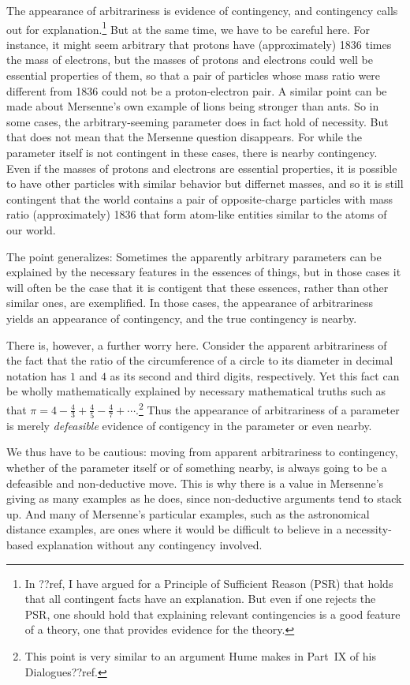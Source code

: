 The appearance of arbitrariness is evidence of contingency, and contingency calls out for explanation.\footnote{In ??ref, I have
argued for a Principle of Sufficient Reason (PSR) that holds that all contingent facts have an explanation. But even if one rejects
the PSR, one should hold that explaining relevant contingencies is a good feature of a theory, one that provides evidence for the
theory.} But at the 
same time, we have to be careful here. For instance,
it might seem arbitrary that protons have (approximately) 1836 times the mass of electrons, but the masses of protons and
electrons could well be essential properties of them, so that a pair of particles whose mass ratio were different from 1836 could 
not be a proton-electron pair. A similar point can be made about Mersenne's own example of lions being stronger
than ants.  So in some cases, the arbitrary-seeming parameter does in fact hold of necessity. But that does not
mean that the Mersenne question disappears. For while the parameter itself is not contingent in these cases, there is 
nearby contingency. Even if the masses of protons and electrons are essential properties, it is possible to have 
other particles with similar
behavior but differnet masses, and so it is still contingent that the world contains a pair of opposite-charge particles with mass ratio 
(approximately) 1836 that form atom-like entities similar to the atoms of our world. 

The point generalizes: Sometimes the apparently arbitrary parameters can be explained by the necessary features in the essences of
things, but in those cases it will often be the case that it is contigent that these essences, rather than other similar ones, are
exemplified. In those cases, the appearance of arbitrariness yields an appearance of contingency, and the true contingency is 
nearby.

There is, however, a further worry here. Consider the apparent arbitrariness of the fact that the ratio of the circumference of
a circle to its diameter in decimal notation has $1$ and $4$ as its second and third digits, respectively. Yet this fact can 
be wholly mathematically explained by necessary mathematical truths such as that $\pi=4-\frac43+\frac45-\frac47+\cdots$.\footnote{This 
point is very similar to an argument Hume makes in Part~IX of his Dialogues??ref.} Thus the appearance of arbitrariness of a parameter is merely
\textit{defeasible} evidence of contigency in the parameter or even nearby. 

We thus have to be cautious: moving from apparent arbitrariness to contingency, whether of the parameter itself or of something nearby, is
always going to be a defeasible and non-deductive move. This is why there is a value in Mersenne's giving as many examples as he does, since 
non-deductive arguments tend to stack up. And many of Mersenne's particular examples, such as the astronomical distance examples, 
are ones where it would be difficult to believe in a necessity-based explanation without any contingency involved. 

